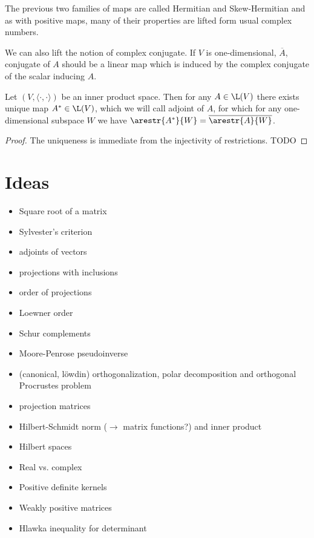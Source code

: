 The previous two families of maps are called Hermitian and Skew-Hermitian and as with positive maps, many of their properties are lifted form usual complex numbers.

We can also lift the notion of complex conjugate. If $V$ is one-dimensional, $\overline{A}$, conjugate of $A$ should be a linear map which is induced by the complex conjugate of the scalar inducing $A$.

\begin{lause}
	Let $(V, \langle \cdot, \cdot \rangle)$ be an inner product space. Then for any $A \in \L(V)$ there exists unique map $A^{*} \in \L(V)$, which we will call adjoint of $A$, for which for any one-dimensional subspace $W$ we have $\arestr{A^{*}}{W} = \overline{\arestr{A}{W}}$.
\end{lause}
\begin{proof}
	The uniqueness is immediate from the injectivity of restrictions. TODO
\end{proof}

\section{Ideas}

\begin{itemize}
	\item Square root of a matrix
	\item Sylvester's criterion
	\item adjoints of vectors
	\item projections with inclusions
	\item order of projections
	\item Loewner order
	\item Schur complements
	\item Moore-Penrose pseudoinverse
	\item (canonical, löwdin) orthogonalization, polar decomposition and orthogonal Procrustes problem
	\item projection matrices
	\item Hilbert-Schmidt norm ($\to$ matrix functions?) and inner product
	\item Hilbert spaces
	\item Real vs. complex
	\item Positive definite kernels
	\item Weakly positive matrices
	\item Hlawka inequality for determinant %
\end{itemize}

